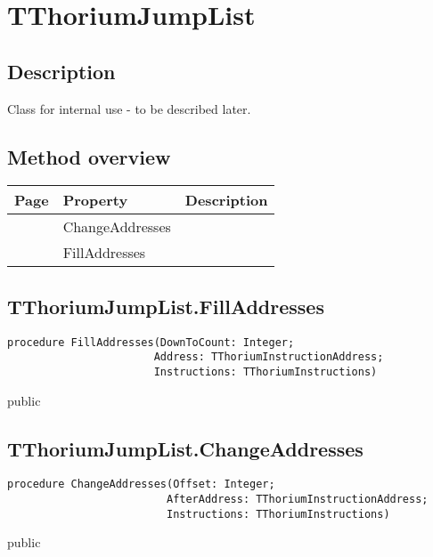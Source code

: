 \section{TThoriumJumpList}
\label{thoriumcorepkg:thorium:tthoriumjumplist}
\subsection{Description}
Class for internal use - to be described later.%
\subsection{Method overview}
\label{thoriumcorepkg:thorium:tthoriumjumplist:methods}
\begin{tabularx}{\textwidth}{llX}
Page & Property & Description  \\ \hline
\pageref{thoriumcorepkg:thorium:tthoriumjumplist:changeaddresses} & ChangeAddresses  &  \\
\pageref{thoriumcorepkg:thorium:tthoriumjumplist:filladdresses} & FillAddresses  &  \\
\hline
\end{tabularx}
\subsection{TThoriumJumpList.FillAddresses}
\label{thoriumcorepkg:thorium:tthoriumjumplist:filladdresses}
\begin{FPCList}
\Declaration 

\begin{verbatim}
procedure FillAddresses(DownToCount: Integer;
                       Address: TThoriumInstructionAddress;
                       Instructions: TThoriumInstructions)
\end{verbatim}
\Visibility
public
\end{FPCList}
\subsection{TThoriumJumpList.ChangeAddresses}
\label{thoriumcorepkg:thorium:tthoriumjumplist:changeaddresses}
\begin{FPCList}
\Declaration 

\begin{verbatim}
procedure ChangeAddresses(Offset: Integer;
                         AfterAddress: TThoriumInstructionAddress;
                         Instructions: TThoriumInstructions)
\end{verbatim}
\Visibility
public
\end{FPCList}
